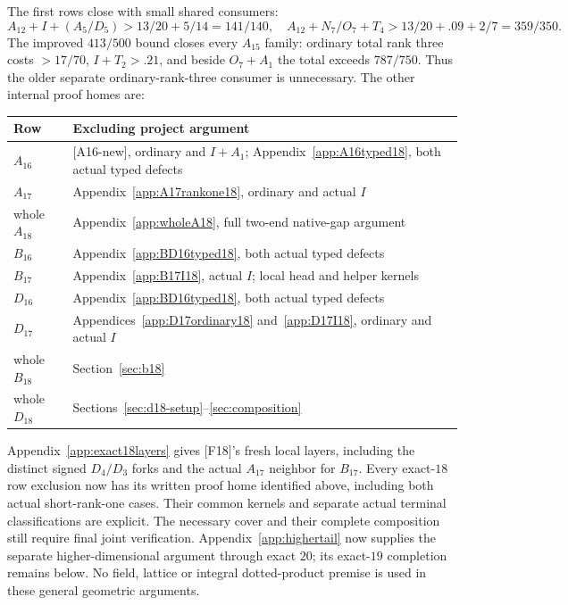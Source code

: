 \documentclass[11pt]{article}
\theoremstyle{definition}
\theoremstyle{remark}
\newcommand{\src}[1]{\textnormal{\textsf{[#1]}}}
\begin{document}
The first rows close with small shared consumers:
\[
 A_{12}+I+(A_5/D_5)>13/20+5/14=141/140,\quad
 A_{12}+N_7/O_7+T_4>13/20+.09+2/7=359/350.
\]
The improved \(413/500\) bound closes every \(A_{15}\) family:
ordinary total rank three costs \(>17/70\), \(I+T_2>.21\),
and beside \(O_7+A_1\) the total exceeds \(787/750\).
Thus the older separate ordinary-rank-three consumer is unnecessary.
The other internal proof homes are:
\begin{center}\small
\begin{tabular}{lp{.69\linewidth}}
\toprule
Row&Excluding project argument\\ \midrule
\(A_{16}\)&\src{A16-new}, ordinary and \(I+A_1\);
 Appendix~\ref{app:A16typed18}, both actual typed defects\\
\(A_{17}\)&Appendix~\ref{app:A17rankone18}, ordinary and actual \(I\)\\
whole \(A_{18}\)&Appendix~\ref{app:wholeA18}, full two-end native-gap argument\\
\(B_{16}\)&Appendix~\ref{app:BD16typed18}, both actual typed defects\\
\(B_{17}\)&Appendix~\ref{app:B17I18}, actual \(I\); local head and helper kernels\\
\(D_{16}\)&Appendix~\ref{app:BD16typed18}, both actual typed defects\\
\(D_{17}\)&Appendices~\ref{app:D17ordinary18} and~\ref{app:D17I18},
 ordinary and actual \(I\)\\
whole \(B_{18}\)&Section~\ref{sec:b18}\\
whole \(D_{18}\)&Sections~\ref{sec:d18-setup}--\ref{sec:composition}\\
\bottomrule
\end{tabular}
\end{center}
Appendix~\ref{app:exact18layers} gives \src{F18}'s fresh local
layers, including the distinct signed \(D_4/D_3\) forks and the
actual \(A_{17}\) neighbor for \(B_{17}\).
Every exact-\(18\) row exclusion now has its written proof home
identified above, including both actual short-rank-one cases.
Their common kernels and separate actual terminal classifications
are explicit. The necessary cover and their complete composition
still require final joint verification. Appendix~\ref{app:highertail}
now supplies the separate higher-dimensional argument through exact
\(20\); its exact-\(19\) completion remains below.
No field, lattice or integral dotted-product premise is used in these
general geometric arguments.
\end{document}
